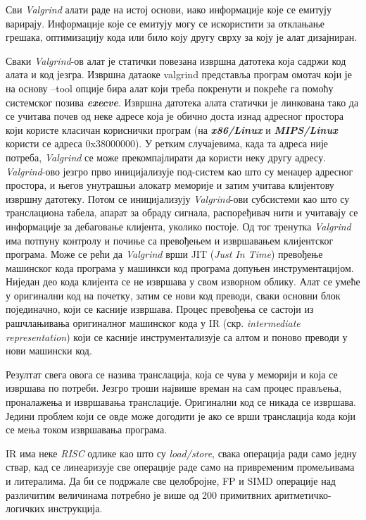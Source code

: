 \documentclass[12pt,oneside]{memoir}
\begin{document}
\indent Сви \textit{Valgrind} алати раде на истој основи, иако информације које се емитују варирају. Информације које се емитују могу се искористити за отклањање грешака, оптимизацију кода или било коју другу сврху за коју је алат дизајниран.

\indent Сваки \textit{Valgrind}-ов алат је статички повезана извршна датотека која садржи код алата и код језгра. Извршна датаоке valgrind представља програм омотач који је на основу --tool опције бира алат који треба покренути и покреће га помоћу системског позива \textbf{\textit{execve}}. Извршна датотека алата статички је линкована тако да се учитава почев од неке адресе која је обично доста изнад адресног простора који користе класичан кориснички програм (на \textbf{\textit{x86/Linux}} и \textbf{\textit{MIPS/Linux}} користи се адреса 0x38000000). У ретким случајевима, када та адреса није потреба, \textit{Valgrind} се може прекомпајлирати да користи неку другу адресу. \textit{Valgrind}-ово језгро прво иницијализује под-систем као што су менаџер адресног простора, и његов унутрашњи алокатр меморије и затим учитава клијентову извршну датотеку. Потом се иницијализују \textit{Valgrind}-ови субсистеми као што су транслациона табела, апарат за обраду сигнала, распоређивач нити и учитавају се информације за дебаговање клијента, уколико постоје. Од тог тренутка \textit{Valgrind} има потпуну контролу и почиње са превођењем и извршавањем клијентског програма. Може се рећи да \textit{Valgrind} врши JIT (\textit{Just In Time}) превођење машинског кода програма у машинкси код програма допуњен инструментацијом. Ниједан део кода клијента се не извршава у свом изворном облику. Алат се умеће у оригинални код на почетку, затим се нови код преводи, сваки основни блок појединачно, који се касније извршава. Процес превођења се састоји из рашчлањивања оригиналног машинског кода у IR (скр. \textit{intermediate representation}) који се касније инструментализује са алтом и поново преводи у нови машински код. 

\indent Резултат свега овога се назива транслација, која се чува у меморији и која се извршава по потреби. Језгро троши највише времан на сам процес прављења, проналажења и извршавања транслације. Оригинални код се никада се извршава. Једини проблем који се овде може догодити је ако се врши транслација кода који се мења током извршавања програма.

\indent IR има неке \textit{RISC} одлике као што су \textit{load/store}, свака операција ради само једну ствар, кад се линеаризује све операције раде само на привременим промељивама и литералима. Да би се подржале све целобројне, FP и SIMD операције над различитим величинама потребно је више од 200 примитвних аритметичко-логичких инструкција. 
\end{document}
